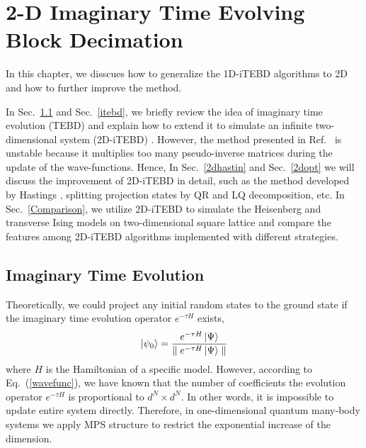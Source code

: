 \chapter{2-D Imaginary Time Evolving Block Decimation}
\label{chapter:2ditebd}
In this chapter, we disscues how to generalize the 1D-iTEBD algorithms to 2D and how to further improve the method.

In Sec.~\ref{ite} and Sec.~\ref{itebd}, we briefly review the idea of imaginary time evolution (TEBD) \cite{PhysRevLett.93.040502} \cite{PhysRevB.78.155117} and explain how to extend it to simulate an infinite two-dimensional system (2D-iTEBD) \cite{PhysRevB.86.195137}. However, the method presented in Ref.~\cite{hahaPhysRevB.86.195137} is unstable because it multiplies too many pseudo-inverse matrices during the update of the wave-functions. Hence, In Sec.~\ref{2dhastin} and Sec.~\ref{2dopt} we will discuss the improvement of 2D-iTEBD in detail, such as the method developed by Hastings \cite{light_hastings}, splitting projection states by QR and LQ decomposition, etc. In Sec.~\ref{Comparison}, we utilize 2D-iTEBD to simulate the Heisenberg and transverse Ising models on two-dimensional square lattice and compare the features among 2D-iTEBD algorithms implemented with different strategies.


\section{Imaginary Time Evolution}
\label{ite}
Theoretically, we could project any initial random states to the ground state if the imaginary time evolution operator $e^{-\tau H}$ exists,  
\begin{align}
	\label{mapgroud}
	\Ket{\psi_0} = \frac{e^{-\tau H} \Ket{\Psi}}{\parallel e^{-\tau H} \Ket{\Psi}\parallel}
\end{align}
where $H$ is the Hamiltonian of a specific model. However, according to Eq.~(\ref{wavefunc}), we have known that the number of coefficients the evolution operator $e^{-\tau H}$ is proportional to $d^N \times d^N$. In other words, it is impossible to update entire system directly. Therefore, in one-dimensional quantum many-body systems we apply MPS structure to restrict the exponential increase of the dimension. 


